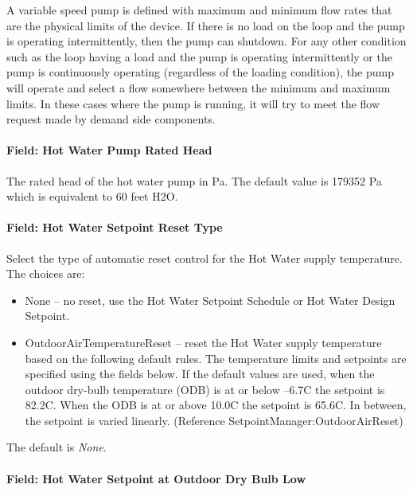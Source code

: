A variable speed pump is defined with maximum and minimum flow rates that are the physical limits of the device. If there is no load on the loop and the pump is operating intermittently, then the pump can shutdown. For any other condition such as the loop having a load and the pump is operating intermittently or the pump is continuously operating (regardless of the loading condition), the pump will operate and select a flow somewhere between the minimum and maximum limits. In these cases where the pump is running, it will try to meet the flow request made by demand side components.

\paragraph{Field: Hot Water Pump Rated Head}\label{field-hot-water-pump-rated-head}

The rated head of the hot water pump in Pa. The default value is 179352 Pa which is equivalent to 60 feet H2O.

\paragraph{Field: Hot Water Setpoint Reset Type}\label{field-hot-water-setpoint-reset-type}

Select the type of automatic reset control for the Hot Water supply temperature. The choices are:

\begin{itemize}
\item
  None -- no reset, use the Hot Water Setpoint Schedule or Hot Water Design Setpoint.
\item
  OutdoorAirTemperatureReset -- reset the Hot Water supply temperature based on the following default rules. The temperature limits and setpoints are specified using the fields below. If the default values are used, when the outdoor dry-bulb temperature (ODB) is at or below --6.7C the setpoint is 82.2C. When the ODB is at or above 10.0C the setpoint is 65.6C. In between, the setpoint is varied linearly. (Reference SetpointManager:OutdoorAirReset)
\end{itemize}

The default is \emph{None}.

\paragraph{Field: Hot Water Setpoint at Outdoor Dry Bulb Low}\label{field-hot-water-setpoint-at-outdoor-dry-bulb-low}

